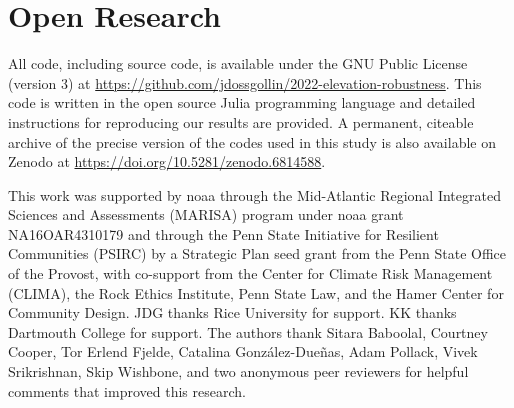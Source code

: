 \documentclass{agujournal2019}
\begin{document}
\section{Open Research}

All code, including source code, is available under the GNU Public License (version 3) at \url{https://github.com/jdossgollin/2022-elevation-robustness}.
This code is written in the open source Julia programming language and detailed instructions for reproducing our results are provided.
A permanent, citeable archive of the precise version of the codes used in this study is also available on Zenodo at \url{https://doi.org/10.5281/zenodo.6814588}.


\acknowledgments

This work was supported by \acrfull{noaa} through the Mid-Atlantic Regional Integrated Sciences and Assessments (MARISA) program under \gls{noaa} grant NA16OAR4310179 and through the Penn State Initiative for Resilient Communities (PSIRC) by a Strategic Plan seed grant from the Penn State Office of the Provost, with co-support from the Center for Climate Risk Management (CLIMA), the Rock Ethics Institute, Penn State Law, and the Hamer Center for Community Design.
JDG thanks Rice University for support.
KK thanks Dartmouth College for support.
The authors thank
Sitara Baboolal,
Courtney Cooper,
Tor Erlend Fjelde,
Catalina González-Dueñas,
Adam Pollack,
Vivek Srikrishnan,
Skip Wishbone,
and two anonymous peer reviewers
for helpful comments that improved this research.





\end{document}
